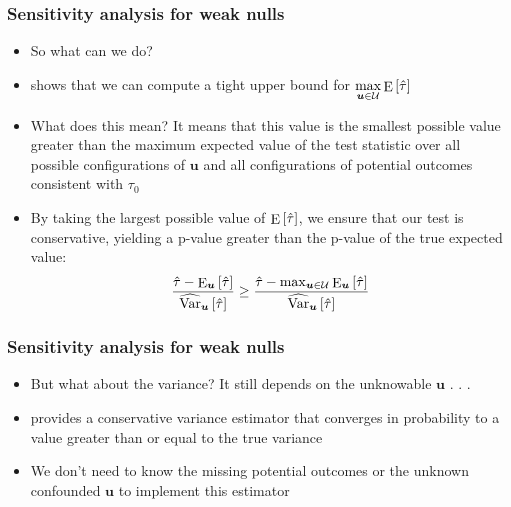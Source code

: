 \documentclass[table, xcolor = {dvipsnames}, 9pt]{beamer}
\theoremstyle{plain}
\DeclareMathOperator{\E}{\rm{E}}
\DeclareMathOperator{\Var}{\rm{Var}}
\begin{document}
\begin{frame}[t]
\frametitle{Sensitivity analysis for weak nulls} 
\vfill
\begin{itemize}
\item So what can we do?
\item \citet{fogarty2020} shows that we can compute a tight upper bound for $\max \limits_{\bm{u} \in \mathcal{U}} \E\left[\hat{\tau}\right]$
\item What does this mean? It means that this value is the smallest possible value greater than the maximum expected value of the test statistic over all possible configurations of $\bm{u}$ and all configurations of potential outcomes consistent with $\tau_0$
\item By taking the largest possible value of $\E\left[\hat{\tau}\right]$, we ensure that our test is conservative, yielding a p-value greater than the p-value of the true expected value:
\begin{equation}
\dfrac{\hat{\tau} - \E_{\bm{u}}\left[\hat{\tau}\right]}{\widehat{\Var}_{\bm{u}}\left[\hat{\tau}\right]} \geq \dfrac{\hat{\tau} - \max_{\bm{u} \in \mathcal{U}} \E_{\bm{u}}\left[\hat{\tau}\right]}{\widehat{\Var}_{\bm{u}}\left[\hat{\tau}\right]} 
\end{equation}
\end{itemize}  
\vfill
\end{frame}
\begin{frame}[t]
\frametitle{Sensitivity analysis for weak nulls} 
\vfill
\begin{itemize}
\item But what about the variance? It still depends on the unknowable $\bm{u}$ . . . 
\item \citet{fogarty2018} provides a conservative variance estimator that converges in probability to a value greater than or equal to the true variance
\item We don't need to know the missing potential outcomes or the unknown confounded $\bm{u}$ to implement this estimator
\end{itemize}  
\vfill
\end{frame}
\end{document}

